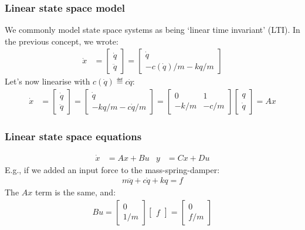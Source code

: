 \documentclass[10pt]{beamer-control}
\begin{document}
\begin{frame}
  \frametitle{Linear state space model}
  We commonly model state space systems as being `linear time invariant' (LTI).
  In the previous concept, we wrote:
  \begin{align}
    \dot x &= \begin{bmatrix}\dot q\\\ddot q\end{bmatrix} = \begin{bmatrix}\dot q\\- c(\dot q)/m - kq/m\end{bmatrix}
  \end{align}
  Let's now linearise with $c(\dot q) \eqdef c \dot q$:
  \begin{align}
    \dot x &= \begin{bmatrix}\dot q\\\ddot q\end{bmatrix} = \begin{bmatrix}\dot q\\- kq/m - c\dot q/m\end{bmatrix}
    = \begin{bmatrix}0 & 1\\- k/m & - c/m\end{bmatrix}\begin{bmatrix} q\\\dot q\end{bmatrix} = Ax
  \end{align}
\end{frame}

\begin{frame}
  \frametitle{Linear state space equations}
  \begin{align}
    \dot x &= Ax + Bu & y &= Cx + Du
  \end{align}
  E.g., if we added an input force to the mass-spring-damper:
  \begin{align}
    m\ddot q + c\dot q + kq = f
  \end{align}
  The $Ax$ term is the same, and:
  \begin{align}
    Bu = \begin{bmatrix} 0\\ 1/m\end{bmatrix}\begin{bmatrix} f\end{bmatrix} = \begin{bmatrix} 0\\ f/m\end{bmatrix}
  \end{align}
\end{frame}
\end{document}

